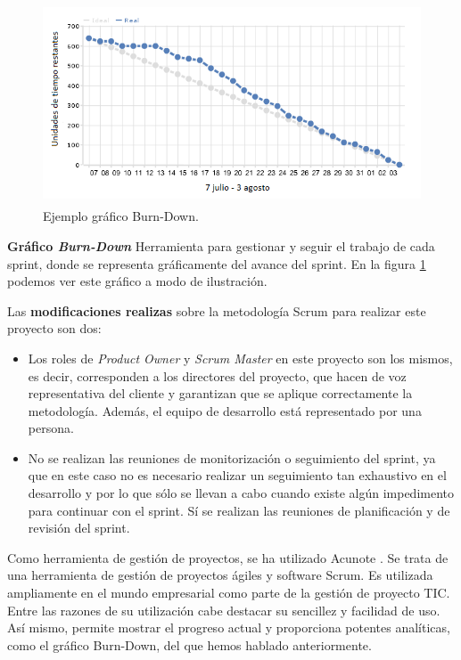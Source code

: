 \begin{figure}[t!]
\centering
\includegraphics[width=12cm,height=6cm]{figuras/burndown.png}
\caption{Ejemplo gráfico Burn-Down.}
\label{fig:burndown}
\end{figure}

\noindent
\textbf{Gráfico \textit{Burn-Down}}
Herramienta para gestionar y seguir el trabajo de cada sprint, donde se representa gráficamente del avance del sprint. En la figura \ref{fig:burndown} podemos ver este gráfico a modo de ilustración.

\noindent
Las \textbf{modificaciones realizas} sobre la metodología Scrum para realizar este proyecto son dos: 
\begin{itemize}
\item Los roles de \textit{Product Owner} y \textit{Scrum Master} en este proyecto son los mismos, es decir, corresponden a los directores del proyecto, que hacen de voz representativa del cliente y garantizan que se aplique correctamente la metodología. Además, el equipo de desarrollo está representado por una persona.
\item No se realizan las reuniones de monitorización o seguimiento del sprint, ya que en este caso no es necesario realizar un seguimiento tan exhaustivo en el desarrollo y por lo que sólo se llevan a cabo cuando existe algún impedimento para continuar con el sprint. Sí se realizan las reuniones de planificación y de revisión del sprint.
\end{itemize}

\noindent
Como herramienta de gestión de proyectos, se ha utilizado Acunote \cite{acunote}. Se trata de una herramienta de gestión de proyectos ágiles y software Scrum. Es utilizada ampliamente en el mundo empresarial como parte de la gestión de proyecto TIC. Entre las razones de su utilización cabe destacar su sencillez y facilidad de uso. Así mismo, permite mostrar el progreso actual y proporciona potentes analíticas, como el gráfico Burn-Down, del que hemos hablado anteriormente.

